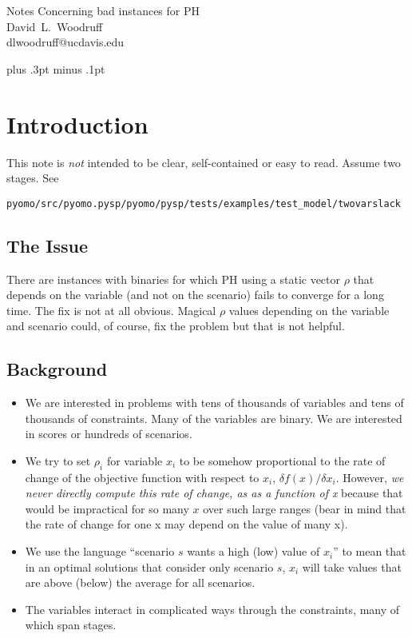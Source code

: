 \documentclass[12pt]{article}
\begin{document}
\begin{center}
  {\LARGE Notes Concerning bad instances for PH}\\[12pt]
  {\large
        \mbox{David L. Woodruff}
  }\\[12pt]
   \mbox{dlwoodruff@ucdavis.edu}
\end{center}

\baselineskip 20pt plus .3pt minus .1pt

\noindent\hrulefill

\noindent 

\noindent\hrulefill


\section{Introduction \label{sec:introduction}}

This note is {\em not} intended to be clear, self-contained or easy to
read. Assume two stages. See

\verb|pyomo/src/pyomo.pysp/pyomo/pysp/tests/examples/test_model/twovarslack|

\subsection{The Issue}

There are instances with binaries for which PH using a static vector
$\rho$ that depends on the variable (and not on the scenario) fails to
converge for a long time. The fix is not at all obvious. Magical
$\rho$ values depending on the variable and scenario could, of course, fix the problem but that is not
helpful.

\subsection{Background}

\begin{itemize}
\item We are interested in problems with tens of thousands of variables and tens of thousands of constraints. Many of the variables are binary. We are interested in scores or hundreds of scenarios.
\item We try to set $\rho_{i}$ for variable $x_{i}$ to be somehow proportional to the rate of change of the objective function with respect to $x_{i}$, $\delta f(x)/\delta x_{i}$. However, {\em we never directly compute this rate of change, as as a function of x} because that would be impractical for so many $x$ over such large ranges (bear in mind that the rate of change for one x may depend on the value of many x).
\item We use the language ``scenario $s$ wants a high (low) value of $x_{i}$'' to mean that in an optimal solutions that consider only scenario $s$, $x_{i}$ will take values that are above (below) the average for all scenarios.
\item The variables interact in complicated ways through the constraints, many of which span stages.
\end{itemize}
\end{document}
